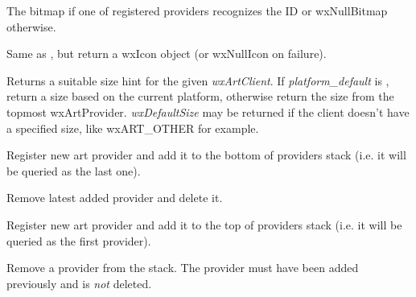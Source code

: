 The bitmap if one of registered providers recognizes the ID or wxNullBitmap otherwise.

\label{wxartprovidergeticon}


Same as , but
return a wxIcon object (or wxNullIcon on failure).


Returns a suitable size hint for the given {\it wxArtClient}. If 
{\it platform\_default} is \true, return a size based on the current platform, 
otherwise return the size from the topmost wxArtProvider. {\it wxDefaultSize} may be 
returned if the client doesn't have a specified size, like wxART\_OTHER for example.

\label{wxartproviderinsertprovider}


Register new art provider and add it to the bottom of providers stack (i.e.
it will be queried as the last one).



\label{wxartproviderctor}


Remove latest added provider and delete it.

\label{wxartproviderpushprovider}


Register new art provider and add it to the top of providers stack (i.e. it
will be queried as the first provider).



\label{wxartproviderremoveprovider}


Remove a provider from the stack. The provider must have been added previously
and is {\it not} deleted.

